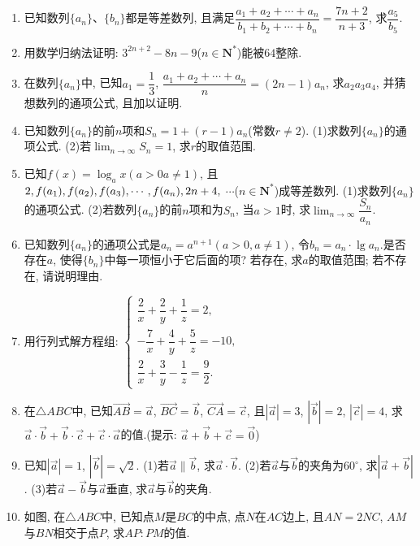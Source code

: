 \documentclass[10pt,a4paper]{article}
\begin{document}
\begin{enumerate}[1.]
\item 已知数列$\{a_n\}$、$\{b_n\}$都是等差数列, 且满足$\dfrac{a_1+a_2+\cdots +a_n}{b_1+b_2+\cdots +b_n}=\dfrac{7n+2}{n+3}$, 求$\dfrac{a_5}{b_5}$.
\item 用数学归纳法证明: $3^{2n+2}-8n-9$($n\in \mathbf{N}^*$)能被$64$整除.
\item 在数列$\{a_n\}$中, 已知$a_1=\dfrac 13$, $\dfrac{a_1+a_2+\cdots +a_n}n=(2n-1)a_n$, 求$a_2a_3a_4$, 并猜想数列的通项公式, 且加以证明.
\item 已知数列$\{a_n\}$的前$n$项和$S_n=1+(r-1)a_n$(常数$r\ne 2$).
(1)求数列$\{a_n\}$的通项公式.
(2)若$\displaystyle\lim_{n\to\infty}S_n=1$, 求$r$的取值范围.
\item 已知$f(x)=\log _ax(a>0a\ne 1)$, 且$\text2,f(a_1),f(a_2),f(a_3),\cdots ,f(a_n),2n+4,$ $\cdots $($n\in \mathbf{N}^*$)成等差数列.
(1)求数列$\{a_n\}$的通项公式.
(2)若数列$\{a_n\}$的前$n$项和为$S_n$, 当$a>1$时, 求$\displaystyle\lim_{n\to\infty}\dfrac{S_n}{a_n}$.
\item 已知数列$\{a_n\}$的通项公式是$a_n=a^{n+1}(a>0,a\ne 1)$, 令$b_n=a_n\cdot \lg a_n$.是否存在$a$, 使得$\{b_n\}$中每一项恒小于它后面的项? 若存在, 求$a$的取值范围; 若不存在, 请说明理由.
\item 用行列式解方程组: $\begin{cases}
    \dfrac 2x+\dfrac 2y+\dfrac 1z=2,  \\-\dfrac 7x+\dfrac 4y+\dfrac 5z=-10,  \\\dfrac 2x+\dfrac 3y-\dfrac 1z=\dfrac 92.  \end{cases}$
\item 在$\triangle ABC$中, 已知$\overrightarrow{AB}=\overrightarrow a$, $\overrightarrow{BC}=\overrightarrow b$, $\overrightarrow{CA}=\overrightarrow c$, 且$|\overrightarrow a|=3$, $|\overrightarrow b|=2$, $|\overrightarrow c|=4$, 求$\overrightarrow a\cdot \overrightarrow b+\overrightarrow b\cdot \overrightarrow c+\overrightarrow c\cdot \overrightarrow a$的值.(提示: $\overrightarrow a+\overrightarrow b+\overrightarrow c=\overrightarrow 0$)
\item 已知$|\overrightarrow a|=1$, $|\overrightarrow b|=\sqrt 2$.
(1)若$\overrightarrow a\parallel \overrightarrow b$, 求$\overrightarrow a\cdot \overrightarrow b$.
(2)若$\overrightarrow a$与$\overrightarrow b$的夹角为$60^{\circ }$, 求$|\overrightarrow a+\overrightarrow b|$.
(3)若$\overrightarrow a-\overrightarrow b$与$\overrightarrow a$垂直, 求$\overrightarrow a$与$\overrightarrow b$的夹角.
\item 如图, 在$\triangle ABC$中, 已知点$M$是$BC$的中点, 点$N$在$AC$边上, 且$AN=2NC$, $AM$与$BN$相交于点$P$, 求$AP:PM$的值.

\end{enumerate}
\end{document}
